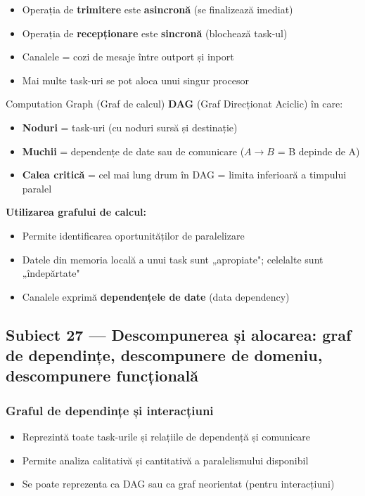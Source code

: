 \documentclass[a4paper,11pt]{article}
\newcommand{\subiect}[2]{\subsection{Subiect \textcolor{numcol}{#1} — #2}}
\begin{document}
\begin{itemize}[noitemsep]
  \item Operația de \textbf{trimitere} este \textbf{asincronă} (se finalizează imediat)
  \item Operația de \textbf{recepționare} este \textbf{sincronă} (blochează task-ul)
  \item Canalele = cozi de mesaje între outport și inport
  \item Mai multe task-uri se pot aloca unui singur procesor
\end{itemize}

\begin{defbox}{Computation Graph (Graf de calcul)}
\textbf{DAG} (Graf Direcționat Aciclic) în care:
\begin{itemize}[noitemsep]
  \item \textbf{Noduri} = task-uri (cu noduri sursă și destinație)
  \item \textbf{Muchii} = dependențe de date sau de comunicare ($A \to B$ = B depinde de A)
  \item \textbf{Calea critică} = cel mai lung drum în DAG = limita inferioară a timpului paralel
\end{itemize}
\end{defbox}

\textbf{Utilizarea grafului de calcul:}
\begin{itemize}[noitemsep]
  \item Permite identificarea oportunităților de paralelizare
  \item Datele din memoria locală a unui task sunt „apropiate"; celelalte sunt „îndepărtate"
  \item Canalele exprimă \textbf{dependențele de date} (data dependency)
\end{itemize}

\subiect{27}{Descompunerea și alocarea: graf de dependințe, descompunere de domeniu, descompunere funcțională}

\subsubsection{Graful de dependințe și interacțiuni}
\begin{itemize}[noitemsep]
  \item Reprezintă toate task-urile și relațiile de dependență și comunicare
  \item Permite analiza calitativă și cantitativă a paralelismului disponibil
  \item Se poate reprezenta ca DAG sau ca graf neorientat (pentru interacțiuni)
\end{itemize}
\end{document}
